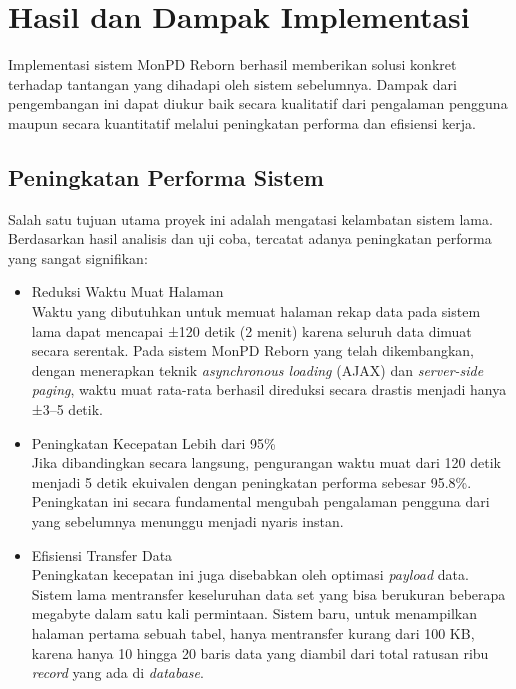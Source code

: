 \section{Hasil dan Dampak Implementasi}
\label{sec:hasildampak}
Implementasi sistem MonPD Reborn berhasil memberikan solusi konkret terhadap tantangan yang dihadapi oleh sistem sebelumnya. Dampak dari pengembangan ini dapat diukur baik secara kualitatif dari pengalaman pengguna maupun secara kuantitatif melalui peningkatan performa dan efisiensi kerja.

\subsection{Peningkatan Performa Sistem}
Salah satu tujuan utama proyek ini adalah mengatasi kelambatan sistem lama. Berdasarkan hasil analisis dan uji coba, tercatat adanya peningkatan performa yang sangat signifikan:
\begin{itemize}
    \item Reduksi Waktu Muat Halaman \\
    Waktu yang dibutuhkan untuk memuat halaman rekap data pada sistem lama dapat mencapai ±120 detik (2 menit) karena seluruh data dimuat secara serentak. Pada sistem MonPD Reborn yang telah dikembangkan, dengan menerapkan teknik \emph{asynchronous loading} (AJAX) dan \emph{server-side paging}, waktu muat rata-rata berhasil direduksi secara drastis menjadi hanya ±3–5 detik.
    \item Peningkatan Kecepatan Lebih dari 95\% \\
    Jika dibandingkan secara langsung, pengurangan waktu muat dari 120 detik menjadi 5 detik ekuivalen dengan peningkatan performa sebesar 95.8\%. Peningkatan ini secara fundamental mengubah pengalaman pengguna dari yang sebelumnya menunggu menjadi nyaris instan.
    \item Efisiensi Transfer Data \\
    Peningkatan kecepatan ini juga disebabkan oleh optimasi \emph{payload} data. Sistem lama mentransfer keseluruhan data set yang bisa berukuran beberapa megabyte dalam satu kali permintaan. Sistem baru, untuk menampilkan halaman pertama sebuah tabel, hanya mentransfer kurang dari 100 KB, karena hanya 10 hingga 20 baris data yang diambil dari total ratusan ribu \emph{record} yang ada di \emph{database}.

\end{itemize}

